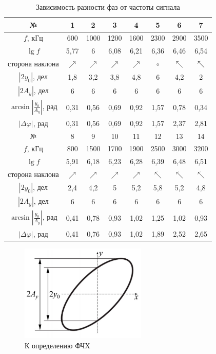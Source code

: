 \documentclass[a4paper,12pt]{article} %
\begin{document}
\begin{table}[H]
	\centering
	\begin{tabular}{|c|c|c|c|c|c|c|c|}
		\hline
		№ & 1 & 2 & 3 & 4 & 5 & 6 & 7 \\ \hline
		$ f $, кГц & 600 & 1000 & 1200 & 1600 & 2300 & 2900 & 3500 \\ \hline
		$ \lg f $ & 5,77 & 6 & 6,08 & 6,21 & 6,36 & 6,46 & 6,54 \\ \hline
		сторона наклона & $ \nearrow $ & $ \nearrow $ & $ \nearrow $ & $ \nearrow $ & $ \circ $ & $ \nwarrow $ & $ \nwarrow $ \\ \hline
		$ \left|2y_0\right| $, дел & 1,8 & 3,2 & 3,8 & 4,8 & 6 & 4,2 & 2 \\ \hline
		$ \left|2A_y\right| $, дел & 6 & 6 & 6 & 6 & 6 & 6 & 6 \\ \hline
		$ \arcsin\left|\frac{y_0}{A_y}\right| $, рад & 0,31 & 0,56 & 0,69 & 0,92 & 1,57 & 0,78 & 0,34 \\ \hline
		$ \left|\Delta\varphi\right| $, рад & 0,31 & 0,56 & 0,69 & 0,92 & 1,57 & 2,37 & 2,81 \\ \hline \hline
		№ & 8 & 9 & 10 & 11 & 12 & 13 & 14 \\ \hline
		$ f $, кГц & 800 & 1500 & 1700 & 1900 & 2500 & 3000 & 3200 \\ \hline
		$ \lg f $ & 5,91 & 6,18 & 6,23 & 6,28 & 6,39 & 6,48 & 6,51 \\ \hline
		сторона наклона & $ \nearrow $ & $ \nearrow $ & $ \nearrow $ & $ \nearrow $ & $ \nwarrow $ & $ \nwarrow $ & $ \nwarrow $ \\ \hline
		$ \left|2y_0\right| $, дел & 2,4 & 4,2 & 5 & 5,2 & 5,8 & 5,2 & 4,8 \\ \hline
		$ \left|2A_y\right| $, дел & 6 & 6 & 6 & 6 & 6 & 6 & 6 \\ \hline
		$ \arcsin\left|\frac{y_0}{A_y}\right| $, рад & 0,41 & 0,78 & 0,93 & 1,02 & 1,25 & 1,02 & 0,93 \\ \hline
		$ \left|\Delta\varphi\right| $, рад & 0,41 & 0,76 & 0,93 & 1,02 & 1,89 & 2,52 & 2,65 \\ \hline
	\end{tabular}
	\caption{Зависимость разности фаз от частоты сигнала}
	\label{tab:fchkh}
\end{table}

\begin{figure}
	\includegraphics[width=6cm]{ellipse.jpg}
	\caption{К определению ФЧХ}
	\label{ellipse}
\end{figure}
\end{document}
